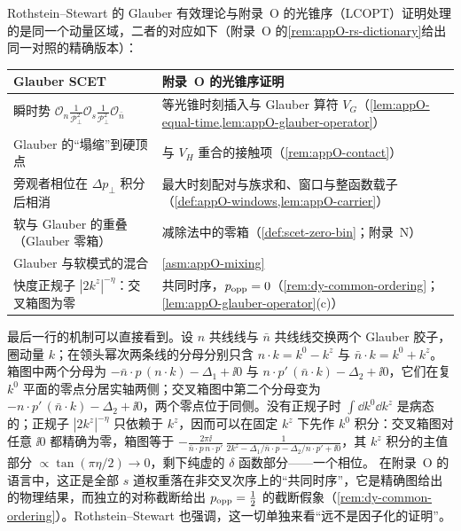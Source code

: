 \begin{remark}\label{rem:scet-glauber-dictionary}
Rothstein--Stewart 的 Glauber 有效理论与附录~O 的光锥序（LCOPT）证明处理的是同一个动量区域，二者的对应如下（附录~O 的\cref{rem:appO-rs-dictionary}给出同一对照的精确版本）：
\begin{center}\small
\renewcommand{\arraystretch}{1.15}
\begin{tabular}{@{}p{}p{}@{}}
\toprule
Glauber SCET\cite{RothsteinStewart2016} & 附录~O 的光锥序证明 \\
\midrule
瞬时势 $\mathcal O_n\frac{1}{\mathcal P_\perp^2}\mathcal O_s\frac{1}{\mathcal P_\perp^2}\mathcal O_{\bar n}$ & 等光锥时刻插入与 Glauber 算符 $V_G$（\cref{lem:appO-equal-time,lem:appO-glauber-operator}） \\
Glauber 的“塌缩”到硬顶点 & 与 $V_H$ 重合的接触项（\cref{rem:appO-contact}） \\
旁观者相位在 $\Delta p_\perp$ 积分后相消 & 最大时刻配对与族求和、窗口与整函数载子（\cref{def:appO-windows,lem:appO-carrier}） \\
软与 Glauber 的重叠（Glauber 零箱） & 减除法中的零箱（\cref{def:scet-zero-bin}；附录~N） \\
Glauber 与软模式的混合 & \cref{asm:appO-mixing} \\
快度正规子 $|2k^z|^{-\eta}$：交叉箱图为零 & 共同时序，$p_{\rm opp}=0$（\cref{rem:dy-common-ordering}；\cref{lem:appO-glauber-operator}(c)） \\
\bottomrule
\end{tabular}
\end{center}
最后一行的机制可以直接看到。设 $n$ 共线线与 $\bar n$ 共线线交换两个 Glauber 胶子，圈动量 $k$；在领头幂次两条线的分母分别只含 $n\cdot k=k^0-k^z$ 与 $\bar n\cdot k=k^0+k^z$。箱图中两个分母为 $-\bar n\cdot p\,(n\cdot k)-\Delta_1+\ii0$ 与 $n\cdot p'\,(\bar n\cdot k)-\Delta_2+\ii0$，它们在复 $k^0$ 平面的零点分居实轴两侧；交叉箱图中第二个分母变为 $-n\cdot p'\,(\bar n\cdot k)-\Delta_2+\ii0$，两个零点位于同侧。没有正规子时 $\int\dd k^0\dd k^z$ 是病态的；正规子 $|2k^z|^{-\eta}$ 只依赖于 $k^z$，因而可以在固定 $k^z$ 下先作 $k^0$ 积分：交叉箱图对任意 $\ii0$ 都精确为零，箱图等于 $-\frac{2\pi\ii}{\bar n\cdot p\,n\cdot p'}\,\frac{1}{2k^z-\Delta_1/\bar n\cdot p-\Delta_2/n\cdot p'+\ii0}$，其 $k^z$ 积分的主值部分 $\propto\tan(\pi\eta/2)\to0$，剩下纯虚的 $\delta$ 函数部分——一个相位\cite[第~5.2~节]{RothsteinStewart2016}。%
在附录~O 的语言中，这正是全部 $s$ 道权重落在非交叉次序上的“共同时序”，它是精确图给出的物理结果，而独立的对称截断给出 $p_{\rm opp}=\frac12$ 的截断假象（\cref{rem:dy-common-ordering}）。Rothstein--Stewart 也强调，这一切单独来看“远不是因子化的证明”。
\end{remark}
